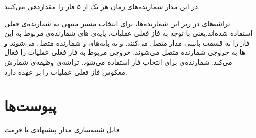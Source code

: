 در این مدار شمارند‌ه‌های
زمان هر یک از ۵ فاز را مقداردهی می‌کنند.

تراشه‌های
در زیر این شمارنده‌ها، برای انتخاب مسیر منتهی به شمارنده‌ی فعلی استفاده شده‌اند.یعنی با توجه به فاز فعلی عملیات، پایه‌ی های شمارنده‌ی مربوط به این فاز را به قسمت پایینی مدار متصل می‌کنند.
و
به پایه‌های
و
شمارنده متصل می‌شوند و
ها به خروجی شمارنده متصل می‌شوند.
خروجی مربوط به فاز فعلی عملیات را فعال می‌کند.
شمارنده‌ی
برای انتخاب فاز استفاده می‌شود. تراشه‌ی
وظیفه‌ی شمارش معکوس فاز فعلی عملیات را بر عهده دارد.

\section{پیوست‌ها}

فایل شبیه‌سازی مدار پیشنهادی با فرمت
